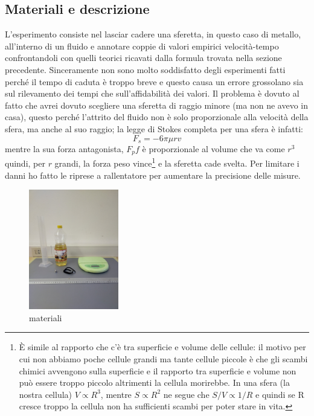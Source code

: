 \subsection{Materiali e descrizione}
L'esperimento consiste nel lasciar cadere una sferetta, in questo caso di metallo, all'interno di un fluido e annotare coppie di valori empirici velocità-tempo confrontandoli con quelli teorici ricavati dalla formula trovata nella sezione precedente. Sinceramente non sono molto soddisfatto degli esperimenti fatti perché il tempo di caduta è troppo breve e questo causa un errore grossolano sia sul rilevamento dei tempi che sull'affidabilità dei valori. Il problema è dovuto al fatto che avrei dovuto scegliere una sferetta di raggio minore (ma non ne avevo in casa), questo perché l'attrito del fluido non è solo proporzionale alla velocità della sfera, ma anche al suo raggio; la legge di Stokes completa per una sfera è infatti:
\begin{equation}
    F_s = - 6\pi\mu rv
\end{equation}
mentre la sua forza antagonista, \(F_pf\) è proporzionale al volume che va come \(r^3\) quindi, per \(r\) grandi, la forza peso vince\footnote{\MakeUppercase{è} simile al rapporto che c'è tra superficie e volume delle cellule: il motivo per cui non abbiamo poche cellule grandi ma tante cellule piccole è che gli scambi chimici avvengono sulla superficie e il rapporto tra superficie e volume non può essere troppo piccolo altrimenti la cellula morirebbe. In una sfera (la nostra cellula) \(V \propto R^3\), mentre \(S \propto R^2\) ne segue che \(S/V \propto 1/R\) e quindi se R cresce troppo la cellula non ha sufficienti scambi per poter stare in vita.} e la sferetta cade svelta. Per limitare i danni ho fatto le riprese a rallentatore per aumentare la precisione delle misure.

\begin{figure} %
    \centering
    \includegraphics[width=0.35\textwidth]{images/img0.jpg}
    \caption{materiali}
\end{figure}


